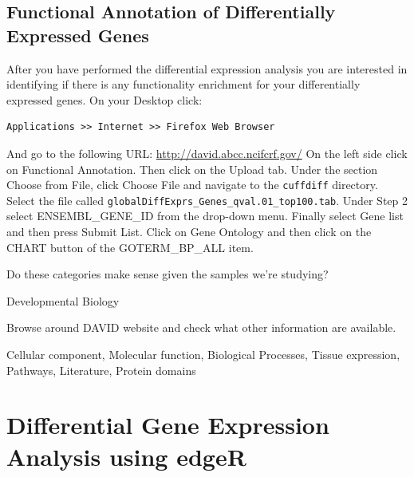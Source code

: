 \newpage
\begin{advanced}
\section{Functional Annotation of Differentially Expressed Genes}

After you have performed the differential expression analysis you are interested
in identifying if there is any functionality enrichment for your differentially
expressed genes.
On your Desktop click:

\begin{lstlisting}[style=command_syntax]
Applications >> Internet >> Firefox Web Browser
\end{lstlisting}

And go to the following URL: \url{http://david.abcc.ncifcrf.gov/}
On the left side click on Functional Annotation. Then click on the Upload tab.
Under the section Choose from File, click Choose File and navigate to the
\texttt{cuffdiff} directory. Select the file called \texttt{globalDiffExprs\_Genes\_qval.01\_top100.tab}.
Under Step 2 select ENSEMBL\_GENE\_ID from the drop-down menu. Finally select
Gene list and then press Submit List.
Click on Gene Ontology and then click on the CHART button of the GOTERM\_BP\_ALL item.

\begin{questions}
Do these categories make sense given the samples we're studying?
\begin{answer}
Developmental Biology
\end{answer}

Browse around DAVID website and check what other information are available.
\begin{answer}
Cellular component, Molecular function, Biological Processes, Tissue expression, Pathways, Literature, Protein domains 
\end{answer}
\end{questions}
\end{advanced}

\newpage
\section{Differential Gene Expression Analysis using edgeR}

